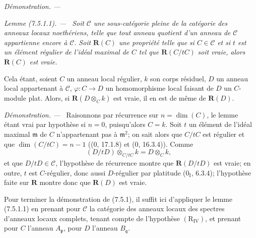 \documentclass[10pt,oneside]{book}
\newcommand{\oldpage}[2][]{%
  \setcounter{footnote}{0}%
  \marginpar{\scriptsize\textbf{#1}~|~#2}\ignorespaces}
\newenvironment{lemma}[1][]{%
  \par\medskip\noindent\itshape Lemme (#1). ---\ }{\par}
\newenvironment{proof}{%
  \par\medskip\noindent\textit{Démonstration. ---\ }}{\par}
\begin{document}
\begin{proof}
\oldpage[IV-2]{205}

\begin{lemma}[7.5.1.1]
\label{IV.2.s7.5.1.1-fr}
Soit $\mathcal C$ une sous-catégorie pleine de la catégorie des anneaux
locaux noethériens, telle que tout anneau quotient d'un anneau de
$\mathcal C$ appartienne encore à $\mathcal C$. Soit $\boldsymbol R(C)$ une
propriété telle que si $C\in\mathcal C$ et si $t$ est un élément régulier de
l'idéal maximal de $C$ tel que $\boldsymbol R(C/tC)$ soit vraie, alors
$\boldsymbol R(C)$ est vraie.

Cela étant, soient $C$ un anneau local régulier, $k$ son corps résiduel,
$D$ un anneau local appartenant à $\mathcal C$,
$\varphi:C\to D$ un homomorphisme local faisant de $D$ un $C$-module plat.
Alors, si $\boldsymbol R(D\otimes_C k)$ est vraie, il en est de même de
$\boldsymbol R(D)$.
\end{lemma}

\begin{proof}
Raisonnons par récurrence sur $n=\dim(C)$, le lemme étant vrai par hypothèse
si $n=0$, puisqu'alors $C=k$. Soit $t$ un élément de l'idéal maximal
$\mathfrak m$ de $C$ n'appartenant pas à $\mathfrak m^2$; on sait alors que
$C/tC$ est régulier et que $\dim(C/tC)=n-1$ ((0, 17.1.8) et (0, 16.3.4)).
Comme
\[
(D/tD)\otimes_{C/tC}k=D\otimes_C k,
\]
et que $D/tD\in\mathcal C$, l'hypothèse de récurrence montre que
$\boldsymbol R(D/tD)$ est vraie; en outre, $t$ est $C$-régulier, donc aussi
$D$-régulier par platitude (0$_{\mathrm I}$, 6.3.4); l'hypothèse faite sur
$\boldsymbol R$ montre donc que $\boldsymbol R(D)$ est vraie.
\end{proof}

Pour terminer la démonstration de (7.5.1), il suffit ici d'appliquer le
lemme (7.5.1.1) en prenant pour $\mathcal C$ la catégorie des anneaux locaux
des spectres d'anneaux locaux complets, tenant compte de l'hypothèse
$(\mathrm R_{\mathrm{IV}})$, et prenant pour $C$ l'anneau
$A_{\mathfrak p}$, pour $D$ l'anneau $B_{\mathfrak q}$.
\end{proof}
\end{document}

